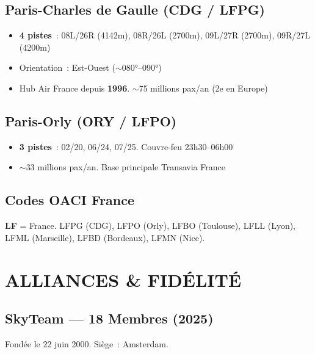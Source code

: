 \documentclass[11pt,a4paper]{article}
\begin{document}
\subsection{Paris-Charles de Gaulle (CDG / LFPG)}
\begin{itemize}[nosep]
\item \textbf{4 pistes}~: 08L/26R (4142m), 08R/26L (2700m), 09L/27R (2700m), 09R/27L (4200m)
\item Orientation~: Est-Ouest ($\sim$080°--090°)
\item Hub Air France depuis \textbf{1996}. $\sim$75 millions pax/an (2e en Europe)
\end{itemize}

\subsection{Paris-Orly (ORY / LFPO)}
\begin{itemize}[nosep]
\item \textbf{3 pistes}~: 02/20, 06/24, 07/25. Couvre-feu 23h30--06h00
\item $\sim$33 millions pax/an. Base principale Transavia France
\end{itemize}

\subsection{Codes OACI France}
\textbf{LF} = France. LFPG (CDG), LFPO (Orly), LFBO (Toulouse), LFLL (Lyon), LFML (Marseille), LFBD (Bordeaux), LFMN (Nice).

\section{ALLIANCES \& FIDÉLITÉ}

\subsection{SkyTeam --- 18 Membres (2025)}
Fondée le 22 juin 2000. Siège~: Amsterdam.
\end{document}
